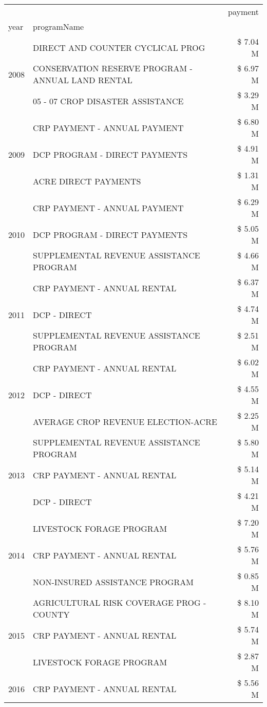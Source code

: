 \begin{tabular}{llr}
\toprule
 &  & payment \\
year & programName &  \\
\midrule
\multirow[t]{3}{*}{2008} & DIRECT AND COUNTER CYCLICAL PROG & \$ 7.04 M \\
 & CONSERVATION RESERVE PROGRAM - ANNUAL LAND RENTAL & \$ 6.97 M \\
 & 05 - 07 CROP DISASTER ASSISTANCE & \$ 3.29 M \\
\cline{1-3}
\multirow[t]{3}{*}{2009} & CRP PAYMENT - ANNUAL PAYMENT & \$ 6.80 M \\
 & DCP PROGRAM - DIRECT PAYMENTS & \$ 4.91 M \\
 & ACRE DIRECT PAYMENTS & \$ 1.31 M \\
\cline{1-3}
\multirow[t]{3}{*}{2010} & CRP PAYMENT - ANNUAL PAYMENT & \$ 6.29 M \\
 & DCP PROGRAM - DIRECT PAYMENTS & \$ 5.05 M \\
 & SUPPLEMENTAL REVENUE ASSISTANCE PROGRAM & \$ 4.66 M \\
\cline{1-3}
\multirow[t]{3}{*}{2011} & CRP PAYMENT - ANNUAL RENTAL & \$ 6.37 M \\
 & DCP - DIRECT & \$ 4.74 M \\
 & SUPPLEMENTAL REVENUE ASSISTANCE PROGRAM & \$ 2.51 M \\
\cline{1-3}
\multirow[t]{3}{*}{2012} & CRP PAYMENT - ANNUAL RENTAL & \$ 6.02 M \\
 & DCP - DIRECT & \$ 4.55 M \\
 & AVERAGE CROP REVENUE ELECTION-ACRE & \$ 2.25 M \\
\cline{1-3}
\multirow[t]{3}{*}{2013} & SUPPLEMENTAL REVENUE ASSISTANCE PROGRAM & \$ 5.80 M \\
 & CRP PAYMENT - ANNUAL RENTAL & \$ 5.14 M \\
 & DCP - DIRECT & \$ 4.21 M \\
\cline{1-3}
\multirow[t]{3}{*}{2014} & LIVESTOCK FORAGE PROGRAM & \$ 7.20 M \\
 & CRP PAYMENT - ANNUAL RENTAL & \$ 5.76 M \\
 & NON-INSURED ASSISTANCE PROGRAM & \$ 0.85 M \\
\cline{1-3}
\multirow[t]{3}{*}{2015} & AGRICULTURAL RISK COVERAGE PROG - COUNTY & \$ 8.10 M \\
 & CRP PAYMENT - ANNUAL RENTAL & \$ 5.74 M \\
 & LIVESTOCK FORAGE PROGRAM & \$ 2.87 M \\
\cline{1-3}
\multirow[t]{3}{*}{2016} & CRP PAYMENT - ANNUAL RENTAL & \$ 5.56 M \\

\end{tabular}
